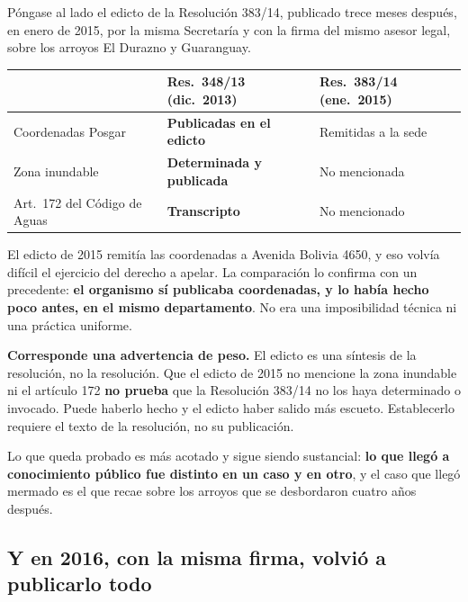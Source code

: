 \begin{cautela}
Póngase al lado el edicto de la Resolución 383/14, publicado trece meses después, en enero de 2015, por la misma Secretaría y con la firma del mismo asesor legal, sobre los arroyos El Durazno y Guaranguay.

\begin{center}\small
\begin{tabular}{@{}p{4.4cm}p{3.8cm}p{3.8cm}@{}}
\toprule
& \textbf{Res.\ 348/13} (dic.\ 2013) & \textbf{Res.\ 383/14} (ene.\ 2015) \\
\midrule
Coordenadas Posgar & \textbf{Publicadas en el edicto} & Remitidas a la sede \\
Zona inundable & \textbf{Determinada y publicada} & No mencionada \\
Art.\ 172 del Código de Aguas & \textbf{Transcripto} & No mencionado \\
\bottomrule
\end{tabular}
\end{center}

El edicto de 2015 remitía las coordenadas a Avenida Bolivia 4650, y eso volvía difícil el ejercicio del derecho a apelar. La comparación lo confirma con un precedente: \textbf{el organismo sí publicaba coordenadas, y lo había hecho poco antes, en el mismo departamento}. No era una imposibilidad técnica ni una práctica uniforme.

\textbf{Corresponde una advertencia de peso.} El edicto es una síntesis de la resolución, no la resolución. Que el edicto de 2015 no mencione la zona inundable ni el artículo 172 \textbf{no prueba} que la Resolución 383/14 no los haya determinado o invocado. Puede haberlo hecho y el edicto haber salido más escueto. Establecerlo requiere el texto de la resolución, no su publicación.

Lo que queda probado es más acotado y sigue siendo sustancial: \textbf{lo que llegó a conocimiento público fue distinto en un caso y en otro}, y el caso que llegó mermado es el que recae sobre los arroyos que se desbordaron cuatro años después.
\end{cautela}

\subsection*{Y en 2016, con la misma firma, volvió a publicarlo todo}

